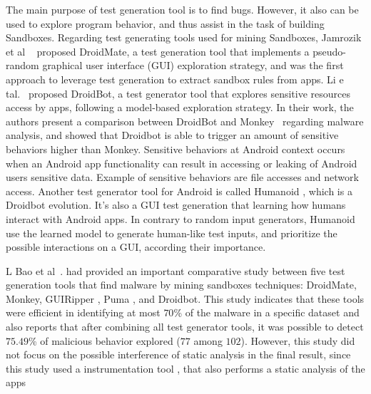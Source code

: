 The main purpose of test generation tool is to find bugs. However, it also can be used to explore program behavior, and thus assist in the task of building Sandboxes. Regarding test generating tools used for mining Sandboxes, Jamrozik et al ~\cite{DBLP:conf/icse/JamrozikZ16} proposed DroidMate, a test generation tool that implements a pseudo-random graphical user interface (GUI) exploration strategy, and was the first approach to leverage test generation to extract sandbox rules from apps. Li e tal.~\cite{DBLP:conf/icse/LiYGC17} proposed DroidBot, a test generator tool that explores sensitive resources access by apps, following a model-based exploration strategy. In their work, the authors present a comparison between DroidBot and Monkey~\cite{Monkey} regarding malware analysis, and showed that Droidbot is able to trigger an amount of sensitive behaviors higher than Monkey. Sensitive behaviors at Android context occurs when an Android app functionality can result in accessing or leaking of Android users sensitive data. Example of sensitive behaviors are file accesses and network access. Another test generator tool for Android is called Humanoid \cite{DBLP:conf/kbse/LiY0C19}, which is a Droidbot evolution. It's also a GUI test generation that learning how humans interact with Android apps. In contrary to random input generators, Humanoid use the learned model to generate human-like test inputs, and prioritize the possible interactions on a GUI, according their importance.






L Bao et al~.\cite{DBLP:conf/wcre/BaoLL18} had provided an important comparative study between five test generation tools that find malware by mining sandboxes techniques: DroidMate, Monkey, GUIRipper \cite{DBLP:conf/kbse/AmalfitanoFTCM12}, Puma \cite{DBLP:conf/mobisys/Hao0NHG14}, and Droidbot. This study indicates that these tools were efficient in identifying at most $70$\% of the malware in a specific dataset and also reports that after combining all test generator tools, it was possible to detect $75.49$\% of malicious behavior explored ($77$ among $102$). However, this study did not focus on the possible interference of static analysis in the final result, since this study used a instrumentation tool \cite{DBLP:conf/icsm/CaiR17a}, that also performs a static analysis of the apps 




